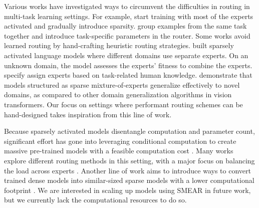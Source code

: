 \documentclass{article}
\theoremstyle{plain}
\theoremstyle{definition}
\theoremstyle{remark}
\begin{document}
Various works have investigated ways to circumvent the difficulties in routing in multi-task learning settings.
For example, \citet{deecke2020latent,hazimeh2021dselect,dua2021tricks} start training with most of the experts activated and gradually introduce sparsity. \citet{kudugunta2021beyond, ponti2022combining, ma2019snr, Gupta2022SparselyAM} group examples from the same task together and introduce task-specific parameters in the router.
Some works avoid learned routing by hand-crafting heuristic routing strategies.
\citet{gururangan2021demix} built sparsely activated language models where different domains use separate experts. On an unknown domain, the model assesses the experts' fitness to combine the experts.
\citet{Tang2022OneMM, Pfeiffer2022LiftingTC, Pfeiffer2020MADXAA} specify assign experts based on task-related human knowledge.
\citet{li2022sparse} demonstrate that models structured as sparse mixture-of-experts generalize effectively to novel domains, as compared to other domain generalization algorithms in vision transformers. 
Our focus on settings where performant routing schemes can be hand-designed takes inspiration from this line of work.

Because sparsely activated models disentangle computation and parameter count, significant effort has gone into leveraging conditional computation to create massive pre-trained models with a feasible computation cost \citep{fedus2022review, shazeer2017outrageously, fedus2021switch,du2022glam,zoph2022designing,yu2022efficient}.
Many works explore different routing methods in this setting, with a major focus on balancing the load across experts \citep{lewis2021base, zhou2022mixture, kool2021unbiased, roller2021hash}.
Another line of work aims to introduce ways to convert trained dense models into similar-sized sparse models with a lower computational footprint \citep{lee2022sparse, zhang2022moefication, komatsuzaki2022sparse}.
We are interested in scaling up models using SMEAR in future work, but we currently lack the computational resources to do so.
\end{document}
